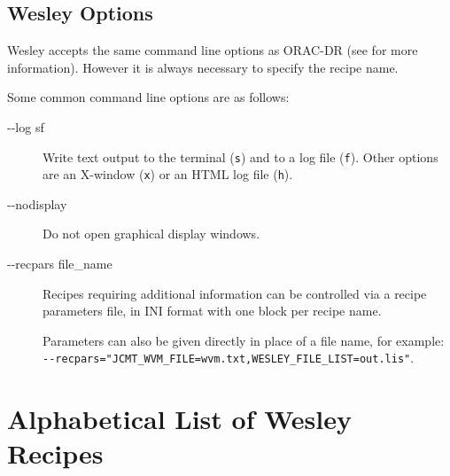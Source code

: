 \documentclass[twoside,11pt,nolof]{starlink}
\begin{document}

\subsection{Wesley Options}

Wesley accepts the same command line options as ORAC-DR
(see \oracdrsun{} for more information).
However it is always necessary to specify the recipe name.

Some common command line options are as follows:

\begin{description}
\item[-{}-log sf] \mbox{}

Write text output to the terminal (\texttt{s}) and to a log file
(\texttt{f}).
Other options are an X-window (\texttt{x}) or an HTML log file (\texttt{h}).

\item[-{}-nodisplay] \mbox{}

Do not open graphical display windows.

\item[-{}-recpars file\_name] \mbox{}

Recipes requiring additional information can be controlled via
a recipe parameters file, in INI format with one block per recipe name.

Parameters can also be given directly in place of a file name,
for example:
\\ \texttt{-{}-recpars="JCMT\_WVM\_FILE=wvm.txt,WESLEY\_FILE\_LIST=out.lis"}.

\end{description}

\newpage
\appendix

\section{Alphabetical List of Wesley Recipes\label{ap:list}}
\end{document}
